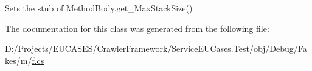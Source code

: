 Sets the stub of Method\-Body.\-get\-\_\-\-Max\-Stack\-Size()



The documentation for this class was generated from the following file\-:\begin{DoxyCompactItemize}
\item 
D\-:/\-Projects/\-E\-U\-C\-A\-S\-E\-S/\-Crawler\-Framework/\-Service\-E\-U\-Cases.\-Test/obj/\-Debug/\-Fakes/m/\hyperlink{m_2f_8cs}{f.\-cs}\end{DoxyCompactItemize}
